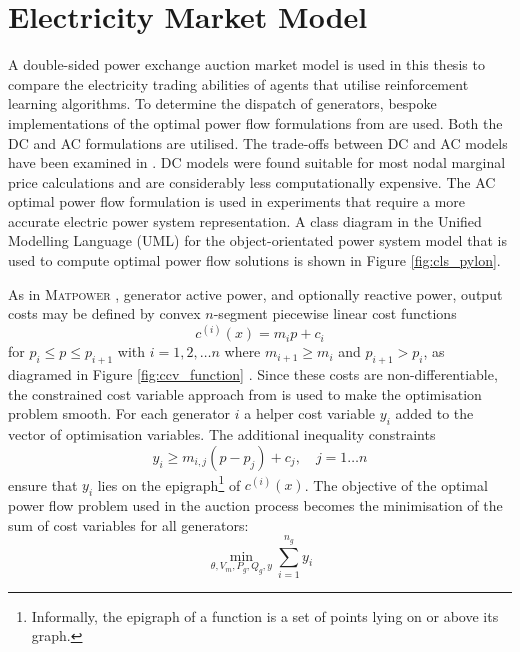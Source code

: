 \section{Electricity Market Model}
A double-sided power exchange auction market model is used in this
thesis to compare the electricity trading abilities of agents that utilise
reinforcement learning algorithms. To determine the dispatch of generators,
bespoke implementations of the optimal power flow formulations from \matpower \cite[\S5]{pserc:mp_manual} are used.  Both the DC
and AC formulations are utilised. The trade-offs between DC and AC models have
been examined in . DC models were found suitable for most
nodal marginal price calculations and are considerably less computationally
expensive. The AC optimal power flow formulation is used in experiments that
require a more accurate electric power system representation. A class diagram
in the Unified Modelling Language (UML) for the object-orientated power system
model that is used to compute optimal power flow solutions is shown in Figure
\ref{fig:cls_pylon}.



As in \textsc{Matpower} \cite[p.26]{pserc:mp_manual}, generator active
power, and optionally reactive power, output costs may be defined by convex
$n$-segment piecewise linear cost functions
\begin{equation}
c^{(i)}(x) = m_ip + c_i
\end{equation}
for $p_i \leq p \leq p_{i+1}$ with $i = 1,2,\dotsc n$ where $m_{i+1} \geq m_i$
and $p_{i+1} > p_i$, as diagramed in Figure \ref{fig:ccv_function}
\cite[Figure5-3]{pserc:mp_manual}. Since these costs are non-differentiable,
the constrained cost variable approach from \cite{zimmerman:ccv} is used to
make the optimisation problem smooth.  For each generator $i$ a helper cost
variable $y_i$ added to the vector of optimisation variables.  The additional
inequality constraints
\begin{equation}
y_i \geq m_{i,j}(p-p_j) + c_j, \quad j = 1\dotsc n
\end{equation}
ensure that $y_i$ lies on the epigraph\footnote{Informally, the epigraph of a
function is a set of points lying on or above its graph.} of $c^{(i)}(x)$. The
objective of the optimal power flow problem used in the auction process
becomes the minimisation of the sum of cost variables for all generators:
\begin{equation}
\min_{\theta, V_m, P_g, Q_g, y} \sum_{i=1}^{n_g}y_i
\end{equation}

